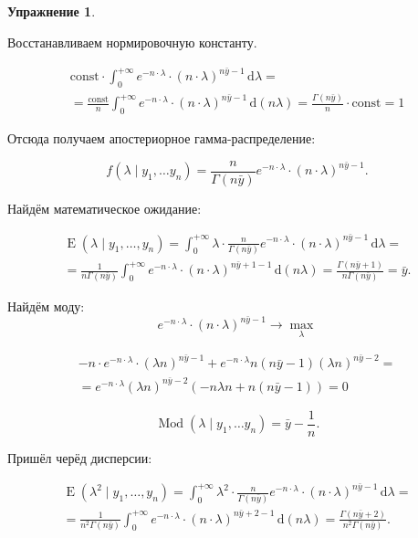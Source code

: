 \documentclass[12pt, a4paper, oneside]{extreport}
\DeclareMathOperator{\E}{\mathop{E}}
\DeclareMathOperator{\Mod}{Mod}
\newcommand{\const}{\mathrm{const}}        %
\newcommand{\dx}[1]{\,\mathrm{d}#1} %
\theoremstyle{plain}              %
\theoremstyle{definition}         %
\newtheorem{problem}{\color{myblue} Упражнение}
\begin{document}
\begin{problem}
\begin{sol}
Восстанавливаем нормировочную константу.

\begin{multline*}
\const \cdot \int_0^{+\infty} e^{-n \cdot \lambda} \cdot (n \cdot\lambda)^{n \bar y - 1} \dx{\lambda} =  \\ = \frac{\const}{n}  \int_0^{+\infty} e^{-n \cdot \lambda} \cdot (n \cdot\lambda)^{n \bar y - 1} \dx{(n \lambda)} = \frac{\Gamma(n \bar y)}{n} \cdot \const = 1
\end{multline*}

Отсюда получаем апостериорное гамма-распределение:

\[ f(\lambda \mid y_1, \ldots y_n) = \frac{n}{\Gamma(n\bar y)} e^{-n \cdot \lambda} \cdot (n \cdot\lambda)^{n \bar y - 1}. \]

Найдём математическое ожидание:

\begin{multline*}
\E(\lambda \mid y_1, \ldots, y_n) = \int_0^{+\infty} \lambda \cdot \frac{n}{\Gamma(n\bar y)} e^{-n \cdot \lambda} \cdot (n \cdot\lambda)^{n \bar y - 1} \dx{\lambda} = \\ = \frac{1}{n \Gamma(n\bar y)} \int_0^{+\infty} e^{-n \cdot \lambda} \cdot (n \cdot\lambda)^{n \bar y + 1 - 1} \dx{(n \lambda)} = \frac{\Gamma(n \bar{y} + 1)}{n \Gamma(n\bar y)} = \bar y.
\end{multline*}

Найдём моду:
\begin{equation*}
e^{-n \cdot \lambda} \cdot (n \cdot\lambda)^{n \bar y - 1}  \longrightarrow \max_{\lambda} 
\end{equation*}

\begin{multline*}
-n \cdot e^{-n \cdot \lambda} \cdot (\lambda n)^{n \bar y - 1} + e^{-n \cdot \lambda} n (n \bar y - 1)(\lambda n)^{n \bar y -2} = \\ = e^{-n \cdot \lambda} (\lambda n)^{n \bar y -2} ( -n \lambda n + n (n \bar y - 1)) = 0 
\end{multline*}

\begin{equation*}
\Mod(\lambda \mid y_1, \ldots y_n) = \bar y - \frac{1}{n}.
\end{equation*}

Пришёл черёд дисперсии:

\begin{multline*}
\E(\lambda^2 \mid y_1, \ldots, y_n) = \int_0^{+\infty} \lambda^2 \cdot \frac{n}{\Gamma(n\bar y)} e^{-n \cdot \lambda} \cdot (n \cdot\lambda)^{n \bar y - 1} \dx{\lambda} = \\ = \frac{1}{n^2 \Gamma(n\bar y)} \int_0^{+\infty} e^{-n \cdot \lambda} \cdot (n \cdot\lambda)^{n \bar y + 2 - 1} \dx{(n \lambda)} = \frac{\Gamma(n \bar{y} + 2)}{n^2 \Gamma(n\bar y)}.
\end{multline*}


\end{sol}
\end{problem}
\end{document}
